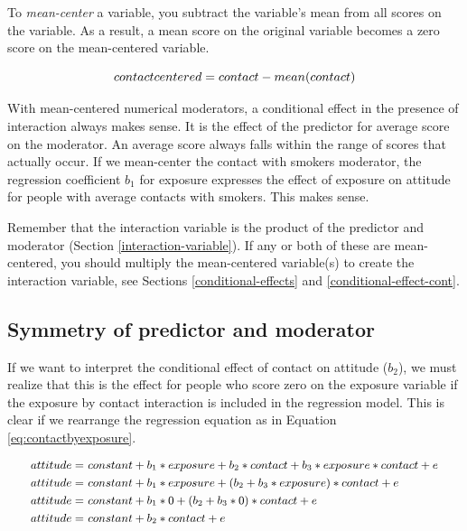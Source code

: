 \documentclass[a4paper]{book}
\theoremstyle{definition}
\theoremstyle{definition}
\theoremstyle{definition}
\theoremstyle{remark}
\begin{document}
To \emph{mean-center} a variable, you subtract the variable's mean from
all scores on the variable. As a result, a mean score on the original
variable becomes a zero score on the mean-centered variable.

\begin{equation*}
\small
  contactcentered = contact - mean(contact)
\normalsize
\end{equation*}

With mean-centered numerical moderators, a conditional effect in the
presence of interaction always makes sense. It is the effect of the
predictor for average score on the moderator. An average score always
falls within the range of scores that actually occur. If we mean-center
the contact with smokers moderator, the regression coefficient \(b_1\)
for exposure expresses the effect of exposure on attitude for people
with average contacts with smokers. This makes sense.

Remember that the interaction variable is the product of the predictor
and moderator (Section \ref{interaction-variable}). If any or both of
these are mean-centered, you should multiply the mean-centered
variable(s) to create the interaction variable, see Sections
\ref{conditional-effects} and \ref{conditional-effect-cont}.

\subsection{Symmetry of predictor and
moderator}\label{symmetry-of-predictor-and-moderator}

If we want to interpret the conditional effect of contact on attitude
(\(b_2\)), we must realize that this is the effect for people who score
zero on the exposure variable if the exposure by contact interaction is
included in the regression model. This is clear if we rearrange the
regression equation as in Equation \eqref{eq:contactbyexposure}.

\begin{equation}
\small
\begin{split}
  attitude = &\ constant + b_1*exposure + b_2*contact + b_3*exposure*contact + e\\
  attitude = &\ constant + b_1*exposure + (b_2 + b_3*exposure)*contact + e\\
  attitude = &\ constant + b_1*0 + (b_2 + b_3*0)*contact + e\\
  attitude = &\ constant + b_2*contact + e\end{split}
\label{eq:contactbyexposure} 
\normalsize
\end{equation}
\end{document}
